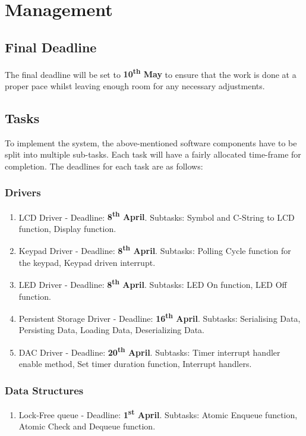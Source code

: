 \documentclass[11pt,a4paper,twocolumn]{scrartcl}
\begin{document}
\section{Management} \label{schedule}
\subsection{Final Deadline}
The final deadline will be set to \textbf{10\textsuperscript{th} May} to ensure that the work is done at a proper pace whilst leaving enough room for any necessary 
adjustments.

\subsection{Tasks}
To implement the system, the above-mentioned software components have to be split into multiple sub-tasks. Each task will have a fairly allocated time-frame for completion. The deadlines for each task are as follows:
\subsubsection{Drivers}
\begin{enumerate}
    \item LCD Driver - Deadline: \textbf{8\textsuperscript{th} April}. Subtasks: Symbol and C-String to LCD function, Display function.
    \item Keypad Driver - Deadline: \textbf{8\textsuperscript{th} April}. Subtasks: Polling Cycle function for the keypad, Keypad driven interrupt.
    \item LED Driver - Deadline: \textbf{8\textsuperscript{th} April}. Subtasks: LED On function, LED Off function.
    \item Persistent Storage Driver - Deadline: \textbf{16\textsuperscript{th} April}. Subtasks: Serialising Data, Persisting Data, Loading Data, Deserializing Data.
    \item DAC Driver - Deadline: \textbf{20\textsuperscript{th} April}. Subtasks: Timer interrupt handler enable method, Set timer duration function, Interrupt handlers.
\end{enumerate}

\subsubsection{Data Structures}
\begin{enumerate}
    \item Lock-Free queue - Deadline: \textbf{1\textsuperscript{st} April}. Subtasks: Atomic Enqueue function, Atomic Check and Dequeue function.
\end{enumerate}
\end{document}
